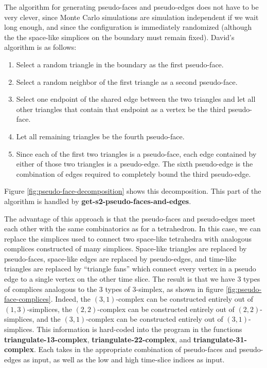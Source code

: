 \documentclass[12pt]{article}
\begin{document}
The algorithm for generating pseudo-faces and pseudo-edges does not
have to be very clever, since Monte Carlo simulations are simulation
independent if we wait long enough, and since the configuration is
immediately randomized (although the the space-like simplices on the
boundary must remain fixed). David's algorithm is as follows:
\begin{enumerate}
\item Select a random triangle in the boundary as the first pseudo-face.
\item Select a random neighbor of the first triangle as a second
  pseudo-face.
\item Select one endpoint of the shared edge between the two triangles
  and let all other triangles that contain that endpoint as a vertex
  be the third pseudo-face.
\item Let all remaining triangles be the fourth pseudo-face.
\item Since each of the first two triangles is a pseudo-face, each
  edge contained by either of those two triangles is a
  pseudo-edge. The sixth pseudo-edge is the combination of edges
  required to completely bound the third pseudo-edge.
\end{enumerate}
Figure \ref{fig:pseudo-face-decomposition} shows this decomposition.
This part of the algorithm is handled by
\textbf{get-s2-pseudo-faces-and-edges}.

The advantage of this approach is that the pseudo-faces and
pseudo-edges meet each other with the same combinatorics as for a
tetrahedron. In this case, we can replace the simplices used to
connect two space-like tetrahedra with analogous complices constructed
of many simplices. Space-like triangles are replaced by pseudo-faces,
space-like edges are replaced by pseudo-edges, and time-like triangles
are replaced by ``triangle fans'' which connect every vertex in a
pseudo edge to a single vertex on the other time slice. The result is
that we have 3 types of complices analogous to the 3 types of
3-simplex, as shown in figure \ref{fig:pseudo-face-complices}. Indeed,
the $(3,1)$-complex can be constructed entirely out of
$(1,3)$-simplices, the $(2,2)$-complex can be constructed entirely out
of $(2,2)$-simplices, and the $(3,1)$-complex can be constructed
entirely out of $(3,1)$-simplices. This information is hard-coded into
the program in the functions \textbf{triangulate-13-complex},
\textbf{triangulate-22-complex}, and
\textbf{triangulate-31-complex}. Each takes in the appropriate
combination of pseudo-faces and pseudo-edges as input, as well as the
low and high time-slice indices as input.
\end{document}
